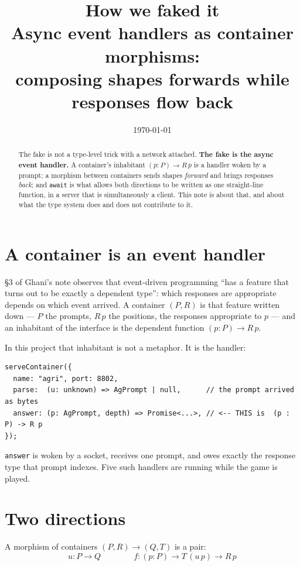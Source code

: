 \documentclass[11pt,a4paper]{article}
\title{\vspace{-2em}\textbf{How we faked it}\\[2mm]
  \large Async event handlers as container morphisms:\\
  composing shapes forwards while responses flow back}
\date{\normalsize\today}
\begin{document}
\maketitle
\thispagestyle{empty}

\begin{abstract}
\noindent
The fake is not a type-level trick with a network attached. \textbf{The fake is
the async event handler.} A container's inhabitant $(p : P) \to R\,p$ is a
handler woken by a prompt; a morphism between containers sends shapes
\emph{forward} and brings responses \emph{back}; and \texttt{await} is what
allows both directions to be written as one straight-line function, in a server
that is simultaneously a client. This note is about that, and about what the
type system does and does not contribute to it.
\end{abstract}

\section{A container is an event handler}

\S3 of Ghani's note observes that event-driven programming ``has a feature that
turns out to be exactly a dependent type'': which responses are appropriate
depends on which event arrived. A container $(P, R)$ is that feature written
down --- $P$ the prompts, $R\,p$ the positions, the responses appropriate to $p$
--- and an inhabitant of the interface is the dependent function
$(p : P) \to R\,p$.

In this project that inhabitant is not a metaphor. It is the handler:

\begin{lstlisting}
serveContainer({
  name: "agri", port: 8802,
  parse:  (u: unknown) => AgPrompt | null,      // the prompt arrived as bytes
  answer: (p: AgPrompt, depth) => Promise<...>, // <-- THIS is  (p : P) -> R p
});
\end{lstlisting}

\noindent \texttt{answer} is woken by a socket, receives one prompt, and owes
exactly the response type that prompt indexes. Five such handlers are running
while the game is played.

\section{Two directions}

A morphism of containers $(P,R) \to (Q,T)$ is a pair:
\[
  u : P \to Q
  \qquad\qquad
  f : (p : P) \to T\,(u\,p) \to R\,p
\]
\end{document}
